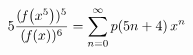 \[5\frac{(\mathop{\mathit{f}\/}\nolimits\!\left(x^{5}\right))^{5}}{(\mathop{%
\mathit{f}\/}\nolimits\!\left(x\right))^{6}}=\sum_{n=0}^{\infty}\mathop{p\/}%
\nolimits\!\left(5n+4\right)x^{n}\]